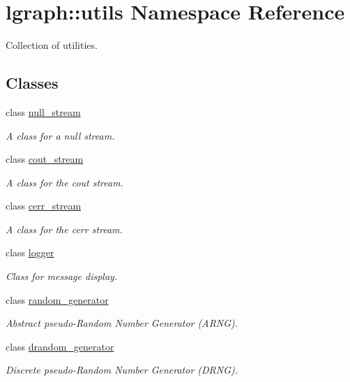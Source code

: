 \hypertarget{namespacelgraph_1_1utils}{\section{lgraph\-:\-:utils Namespace Reference}
\label{namespacelgraph_1_1utils}
}


Collection of utilities.  


\subsection*{Classes}
\begin{DoxyCompactItemize}
\item 
class \hyperlink{classlgraph_1_1utils_1_1null__stream}{null\-\_\-stream}
\begin{DoxyCompactList}\small\item\em A class for a null stream. \end{DoxyCompactList}\item 
class \hyperlink{classlgraph_1_1utils_1_1cout__stream}{cout\-\_\-stream}
\begin{DoxyCompactList}\small\item\em A class for the cout stream. \end{DoxyCompactList}\item 
class \hyperlink{classlgraph_1_1utils_1_1cerr__stream}{cerr\-\_\-stream}
\begin{DoxyCompactList}\small\item\em A class for the cerr stream. \end{DoxyCompactList}\item 
class \hyperlink{classlgraph_1_1utils_1_1logger}{logger}
\begin{DoxyCompactList}\small\item\em Class for message display. \end{DoxyCompactList}\item 
class \hyperlink{classlgraph_1_1utils_1_1random__generator}{random\-\_\-generator}
\begin{DoxyCompactList}\small\item\em Abstract pseudo-\/\-Random Number Generator (A\-R\-N\-G). \end{DoxyCompactList}\item 
class \hyperlink{classlgraph_1_1utils_1_1drandom__generator}{drandom\-\_\-generator}
\begin{DoxyCompactList}\small\item\em Discrete pseudo-\/\-Random Number Generator (D\-R\-N\-G). \end{DoxyCompactList}\item 

\end{DoxyCompactItemize}
